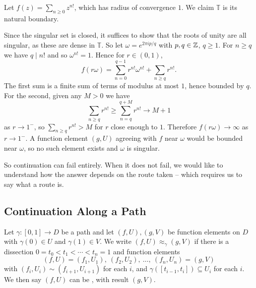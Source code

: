 \documentclass[a4paper]{scrartcl}
\begin{document}
\begin{example}
	Let $f(z) = \sum_{n \geq 0} z^{n!}$, which has radius of convergence $1$. We claim
	$\mathbb{T}$ is its natural boundary.

	Since the singular set is closed, it suffices to show that the roots of unity are all
	singular, as these are dense in $\mathbb{T}$. So let $\omega = e^{2\pi i p /q}$ with
	$p, q \in \mathbb{Z}$, $q \geq 1$. For $n \geq q$ we have $q \mid n!$ and so
	$\omega^{n!} = 1$. Hence for $r \in (0,1)$,
	$$
	f(r\omega) = \sum_{n = 0}^{q-1} r^{n!}\omega^{n!} + \sum_{n \geq q} r^{n!}.
	$$
	The first sum is a finite sum of terms of modulus at most $1$, hence bounded by $q$.
	For the second, given any $M > 0$ we have
	$$
	\sum_{n \geq q} r^{n!} \geq \sum_{n = q}^{q + M} r^{n!} \longrightarrow M + 1
	$$
	as $r \to 1^-$, so $\sum_{n\geq q} r^{n!} > M$ for $r$ close enough to $1$. Therefore
	$f(r\omega) \to \infty$ as $r \to 1^-$. A function element $(g,U)$ agreeing with $f$
	near $\omega$ would be bounded near $\omega$, so no such element exists and $\omega$
	is singular.
\end{example}

So continuation can fail entirely. When it does not fail, we would like to understand how
the answer depends on the route taken -- which requires us to say what a route is.

\subsection{Continuation Along a Path}

\begin{definition}\label{def:contpath}
	Let $\gamma : [0,1] \to D$ be a path and let $(f, U), (g, V)$ be function elements on
	$D$ with $\gamma(0) \in U$ and $\gamma(1) \in V$. We write $(f, U) \approx_\gamma (g,V)$
	if there is a dissection $0 = t_0 < t_1 < \cdots < t_n = 1$ and function elements
	$$
	(f, U) = (f_1, U_1), \ (f_2, U_2), \ \dots, \ (f_n, U_n) = (g, V)
	$$
	with $(f_i, U_i) \sim (f_{i+1}, U_{i+1})$ for each $i$, and
	$\gamma([t_{i-1}, t_i]) \subseteq U_i$ for each $i$. We then say $(f,U)$ can be
	, with result $(g,V)$.
\end{definition}

\begin{center}
\end{center}
\end{document}
